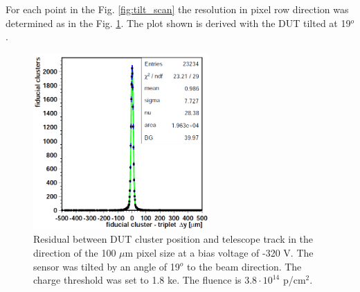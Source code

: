 For each point in the Fig. \ref{fig:tilt_scan} the resolution in pixel row direction was determined as in the Fig. \ref{fig:resol}. The plot shown
is derived with the DUT tilted at 19$^{o}$.

\begin{figure}[t]
 \centering
 \includegraphics[width=0.6\textwidth]{021_pixel_upgrade/plots/resol_dist.png}
 \caption{Residual between DUT cluster position and telescope track in the direction of the 100 $\mu$m pixel size at a bias voltage of -320 V. The sensor 
 was tilted by an angle of 19$^{o}$ to the beam direction. The charge threshold was set to 1.8 ke. The fluence is $3.8 \cdot 10^{14}$ p/cm$^2$.}
 \label{fig:resol}
\end{figure}